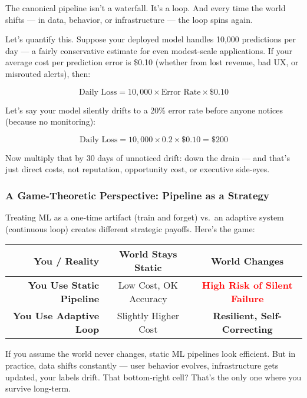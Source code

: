The canonical pipeline isn’t a waterfall. It’s a loop. And every time the world shifts — in data, behavior, or infrastructure — the loop spins again.

\vspace{1em}

Let’s quantify this. Suppose your deployed model handles 10,000 predictions per day — a fairly conservative estimate for even modest-scale applications. If your average cost per prediction error is \$0.10 (whether from lost revenue, bad UX, or misrouted alerts), then:

\[
\text{Daily Loss} = 10{,}000 \times \text{Error Rate} \times \$0.10
\]

Let’s say your model silently drifts to a 20\% error rate before anyone notices (because no monitoring):

\[
\text{Daily Loss} = 10{,}000 \times 0.2 \times \$0.10 = \$200
\]

Now multiply that by 30 days of unnoticed drift:  down the drain — and that’s just direct costs, not reputation, opportunity cost, or executive side-eyes.

\vspace{1em}

\subsubsection*{A Game-Theoretic Perspective: Pipeline as a Strategy}

Treating ML as a one-time artifact (train and forget) vs.\ an adaptive system (continuous loop) creates different strategic payoffs. Here's the game:

\begin{center}
\begin{tabular}{r|c|c}
\textbf{You / Reality} & \textbf{World Stays Static} & \textbf{World Changes} \\
\hline
\textbf{You Use Static Pipeline} & Low Cost, OK Accuracy & \textcolor{red}{\textbf{High Risk of Silent Failure}} \\
\textbf{You Use Adaptive Loop} & Slightly Higher Cost & \textcolor{green!60!black}{\textbf{Resilient, Self-Correcting}} \\
\end{tabular}
\end{center}

If you assume the world never changes, static ML pipelines look efficient. But in practice, data shifts constantly — user behavior evolves, infrastructure gets updated, your labels drift. That bottom-right cell? That’s the only one where you survive long-term.


